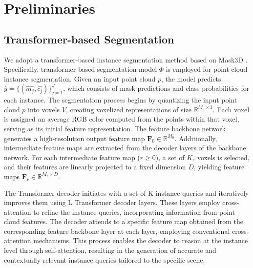 \section{Preliminaries}


\subsection{Transformer-based Segmentation}
We adopt a transformer-based instance segmentation method based on Mask3D \cite{Schult23ICRA}. Specifically, transformer-based segmentation model $\Phi$ is employed for point cloud instance segmentation. Given an input point cloud $p$, the model predicts $\hat{y} = \{(\hat{m_j}, \hat{c_j})\}_{j=1}^J$, which consists of mask predictions and class probabilities for each instance.
The segmentation process begins by quantizing the input point cloud $p$ into voxels $V$, creating voxelized representations of size $\mathbb{R}^{M_0 \times 3}$. Each voxel is assigned an average RGB color computed from the points within that voxel, serving as its initial feature representation. The feature backbone network generates a high-resolution output feature map $\mathbf{F}_0 \in \mathbb{R}^{M_0}$. Additionally, intermediate feature maps are extracted from the decoder layers of the backbone network.
For each intermediate feature map ($r \geq 0$), a set of $K_r$ voxels is selected, and their features are linearly projected to a fixed dimension $D$, yielding feature maps $\mathbf{F}_r \in \mathbb{R}^{M_{r} \times D}$. 

The Transformer decoder initiates with a set of K instance queries and iteratively improves them using L Transformer decoder layers. These layers employ cross-attention to refine the instance queries, incorporating information from point cloud features. The decoder attends to a specific feature map obtained from the corresponding feature backbone layer at each layer, employing conventional cross-attention mechanisms. This process enables the decoder to reason at the instance level through self-attention, resulting in the generation of accurate and contextually relevant instance queries tailored to the specific scene. %

